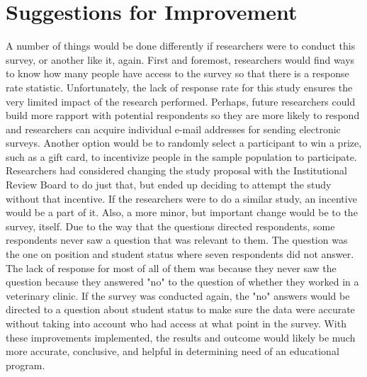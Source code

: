 \section{Suggestions for Improvement}
A number of things would be done differently if researchers were to conduct this survey, or another like it, again. First and foremost, researchers would find ways to know how many people have access to the survey so that there is a response rate statistic. Unfortunately, the lack of response rate for this study ensures the very limited impact of the research performed. Perhaps, future researchers could build more rapport with potential respondents so they are more likely to respond and researchers can acquire individual e-mail addresses for sending electronic surveys. Another option would be to randomly select a participant to win a prize, such as a gift card, to incentivize people in the sample population to participate. Researchers had considered changing the study proposal with the Institutional Review Board to do just that, but ended up deciding to attempt the study without that incentive. If the researchers were to do a similar study, an incentive would be a part of it. Also, a more minor, but important change would be to the survey, itself. Due to the way that the questions directed respondents, some respondents never saw a question that was relevant to them. The question was the one on position and student status where seven respondents did not answer. The lack of response for most of all of them was because they never saw the question because they answered "no" to the question of whether they worked in a veterinary clinic. If the survey was conducted again, the "no" answers would be directed to a question about student status to make sure the data were accurate without taking into account who had access at what point in the survey. With these improvements implemented, the results and outcome would likely be much more accurate, conclusive, and helpful in determining need of an educational program.

